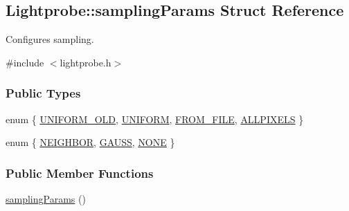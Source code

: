 \hypertarget{structLightprobe_1_1samplingParams}{\subsection{\-Lightprobe\-:\-:sampling\-Params \-Struct \-Reference}
\label{structLightprobe_1_1samplingParams}
}


\-Configures sampling.  




{\ttfamily \#include $<$lightprobe.\-h$>$}

\subsubsection*{\-Public \-Types}
\begin{DoxyCompactItemize}
\item 
enum \{ \hyperlink{structLightprobe_1_1samplingParams_ac874450dc597a8d6fe6518d887e57b42a3f5bb5012d1d4080fe79ee0313ea47ec}{\-U\-N\-I\-F\-O\-R\-M\-\_\-\-O\-L\-D}, 
\hyperlink{structLightprobe_1_1samplingParams_ac874450dc597a8d6fe6518d887e57b42a8c33a4120abe67d94806fd5776b70dc8}{\-U\-N\-I\-F\-O\-R\-M}, 
\hyperlink{structLightprobe_1_1samplingParams_ac874450dc597a8d6fe6518d887e57b42adacea0b854621cd302ad70127b25e33b}{\-F\-R\-O\-M\-\_\-\-F\-I\-L\-E}, 
\hyperlink{structLightprobe_1_1samplingParams_ac874450dc597a8d6fe6518d887e57b42a13ef0f72e6baffc7f232b3d2c53fa578}{\-A\-L\-L\-P\-I\-X\-E\-L\-S}
 \}
\item 
enum \{ \hyperlink{structLightprobe_1_1samplingParams_a74ce19632f187b4a7f8b759726ce34c4aec0a244741f1621137ec9df593f245ff}{\-N\-E\-I\-G\-H\-B\-O\-R}, 
\hyperlink{structLightprobe_1_1samplingParams_a74ce19632f187b4a7f8b759726ce34c4a0eb39a079d7ec8ec37ff1d9f278f9f7e}{\-G\-A\-U\-S\-S}, 
\hyperlink{structLightprobe_1_1samplingParams_a74ce19632f187b4a7f8b759726ce34c4a8d9388e42bdafcdf31ae49c0ed5d7ca3}{\-N\-O\-N\-E}
 \}
\end{DoxyCompactItemize}
\subsubsection*{\-Public \-Member \-Functions}
\begin{DoxyCompactItemize}
\item 
\hyperlink{structLightprobe_1_1samplingParams_a54452c793fd27e71ed0d35b8d5c38912}{sampling\-Params} ()
\end{DoxyCompactItemize}
